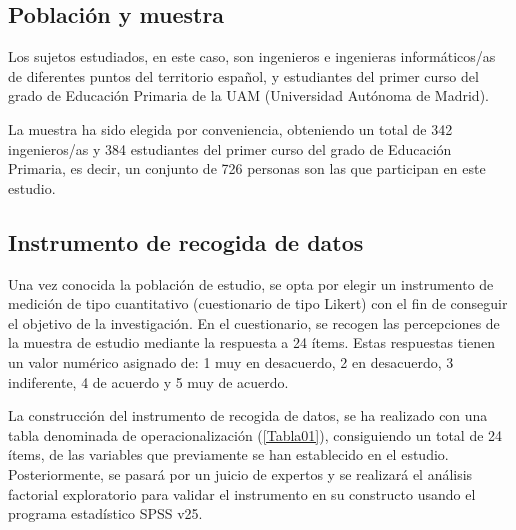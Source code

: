 \documentclass[spanish]{textolivre}
\begin{document}
\subsection{Población y muestra}

Los sujetos estudiados, en este caso, son ingenieros e ingenieras informáticos/as de diferentes puntos del territorio español, y estudiantes del primer curso del grado de Educación Primaria de la UAM (Universidad Autónoma de Madrid).

La muestra ha sido elegida por conveniencia, obteniendo un total de 342 ingenieros/as y 384 estudiantes del primer curso del grado de Educación Primaria, es decir, un conjunto de 726 personas son las que participan en este estudio.

\subsection{Instrumento de recogida de datos}

Una vez conocida la población de estudio, se opta por elegir un instrumento de medición de tipo cuantitativo (cuestionario de tipo Likert) con el fin de conseguir el objetivo de la investigación. En el cuestionario, se recogen las percepciones de la muestra de estudio mediante la respuesta a 24 ítems. Estas respuestas tienen un valor numérico asignado de: 1 muy en desacuerdo, 2 en desacuerdo, 3 indiferente, 4 de acuerdo y 5 muy de acuerdo.

La construcción del instrumento de recogida de datos, se ha realizado con una tabla denominada de operacionalización (\cref{Tabla01}), consiguiendo un total de 24 ítems, de las variables que previamente se han establecido en el estudio. Posteriormente, se pasará por un juicio de expertos y se realizará el análisis factorial exploratorio para validar el instrumento en su constructo usando el programa estadístico SPSS v25.
\end{document}
